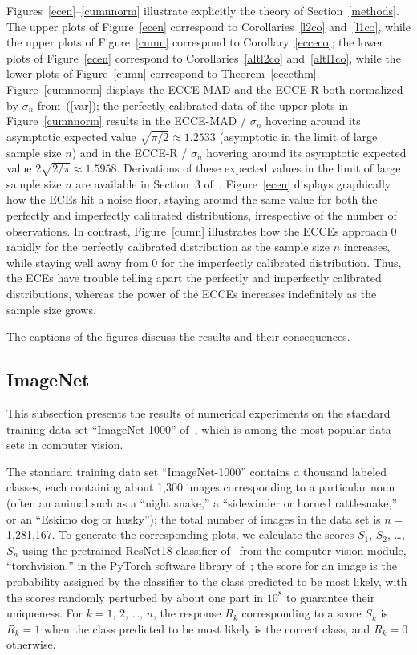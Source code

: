 \documentclass{article}
\begin{document}
Figures~\ref{ecen}--\ref{cumnnorm} illustrate explicitly the theory
of Section~\ref{methods}.
The upper plots of Figure~\ref{ecen}
correspond to Corollaries~\ref{l2co} and~\ref{l1co},
while the upper plots of Figure~\ref{cumn}
correspond to Corollary~\ref{ecceco};
the lower plots of Figure~\ref{ecen}
correspond to Corollaries~\ref{altl2co} and~\ref{altl1co},
while the lower plots of Figure~\ref{cumn}
correspond to Theorem~\ref{eccethm}.
Figure~\ref{cumnnorm} displays the ECCE-MAD and the ECCE-R
both normalized by $\sigma_n$ from~(\ref{var}); the perfectly calibrated data
of the upper plots in Figure~\ref{cumnnorm} results
in the ECCE-MAD / $\sigma_n$ hovering around its asymptotic expected value
$\sqrt{\pi/2} \approx 1.2533$
(asymptotic in the limit of large sample size $n$)
and in the ECCE-R / $\sigma_n$ hovering around its asymptotic expected value
$2 \sqrt{2/\pi} \approx 1.5958$.
Derivations of these expected values in the limit of large sample size $n$
are available in Section~3 of~\cite{tygert_pvals}.
Figure~\ref{ecen} displays graphically how the ECEs hit a noise floor,
staying around the same value for both the perfectly
and imperfectly calibrated distributions,
irrespective of the number of observations.
In contrast, Figure~\ref{cumn} illustrates how the ECCEs approach 0 rapidly
for the perfectly calibrated distribution as the sample size $n$ increases,
while staying well away from 0 for the imperfectly calibrated distribution.
Thus, the ECEs have trouble telling apart
the perfectly and imperfectly calibrated distributions,
whereas the power of the ECCEs increases indefinitely as the sample size grows.

The captions of the figures discuss the results and their consequences.


\subsection{ImageNet}
\label{imagenet}

This subsection presents the results of numerical experiments
on the standard training data set ``ImageNet-1000'' of~\cite{imagenet},
which is among the most popular data sets in computer vision.

The standard training data set ``ImageNet-1000''
contains a thousand labeled classes, each containing about 1,300 images
corresponding to a particular noun (often an animal such as a ``night snake,''
a ``sidewinder or horned rattlesnake,'' or an ``Eskimo dog or husky'');
the total number of images in the data set is $n =$ 1,281,167.
To generate the corresponding plots,
we calculate the scores $S_1$, $S_2$, \dots, $S_n$
using the pretrained ResNet18 classifier of~\cite{he-zhang-ren-sun}
from the computer-vision module, ``torchvision,''
in the PyTorch software library of~\cite{pytorch};
the score for an image is the probability assigned by the classifier
to the class predicted to be most likely,
with the scores randomly perturbed by about one part in $10^8$ to guarantee
their uniqueness.
For $k = 1$, $2$, \dots, $n$, the response $R_k$ corresponding to a score $S_k$
is $R_k = 1$ when the class predicted to be most likely is the correct class,
and $R_k = 0$ otherwise.
\end{document}
